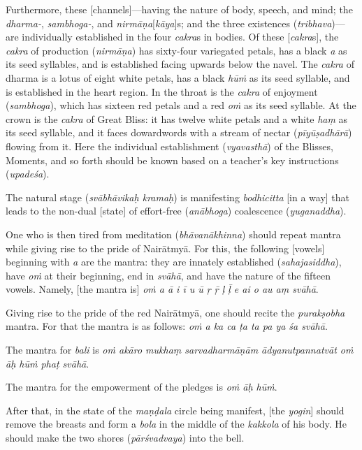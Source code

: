 \documentclass[naipra.tex]{subfiles}
\begin{document}
Furthermore, these [channels]—having the nature of body, speech, and mind; the \emph{dharma-}, \emph{sambhoga-}, and \emph{nirmāṇa}[\emph{kāya}]s; and the three existences (\emph{tribhava})—are individually established in the four \emph{cakra}s in bodies.
Of these [\emph{cakra}s], the \emph{cakra} of production (\emph{nirmāṇa}) has sixty-four variegated petals, has a black \emph{a} as its seed syllables, and is established facing upwards below the navel.
The \emph{cakra} of dharma is a lotus of eight white petals, has a black \emph{hūṁ} as its seed syllable, and is established in the heart region.
In the throat is the \emph{cakra} of enjoyment (\emph{sambhoga}), which has sixteen red petals and a red \emph{oṁ} as its seed syllable.
At the crown is the \emph{cakra} of Great Bliss: it has twelve white petals and a white \emph{haṃ} as its seed syllable, and it faces dowardwords with a stream of nectar (\emph{pīyūṣadhārā}) flowing from it.
Here the individual establishment (\emph{vyavasthā}) of the Blisses, Moments, and so forth should be known based on a teacher's key instructions (\emph{upadeśa}).

The natural stage (\emph{svābhāvikaḥ kramaḥ}) is manifesting \emph{bodhicitta} [in a way] that leads to the non-dual [state] of effort-free (\emph{anābhoga}) coalescence (\emph{yuganaddha}).

One who is then tired from meditation (\emph{bhāvanākhinna}) should repeat mantra while giving rise to the pride of Nairātmyā.
For this, the following [vowels] beginning with \emph{a} are the mantra: they are innately established (\emph{sahajasiddha}), have \emph{oṁ} at their beginning, end in \emph{svāhā}, and have the nature of the fifteen vowels.
Namely, [the mantra is] \emph{oṁ a ā i ī u ū ṛ ṝ ḷ ḹ e ai o au aṃ svāhā}.

Giving rise to the pride of the red Nairātmyā, one should recite the \emph{purakṣobha} mantra.
For that the mantra is as follows: \emph{oṁ a ka ca ṭa ta pa ya śa svāhā}.

The mantra for \emph{bali} is \emph{oṁ akāro mukhaṃ sarvadharmāṇām ādyanutpannatvāt oṁ āḥ hūṁ phaṭ svāhā}.

The mantra for the empowerment of the pledges is \emph{oṁ āḥ hūṁ}.

After that, in the state of the \emph{maṇḍala} circle being manifest, [the \emph{yogin}] should remove the breasts and form a \emph{bola} in the middle of the \emph{kakkola} of his body.
He should make the two shores (\emph{pārśvadvaya}) into the bell.
\end{document}
